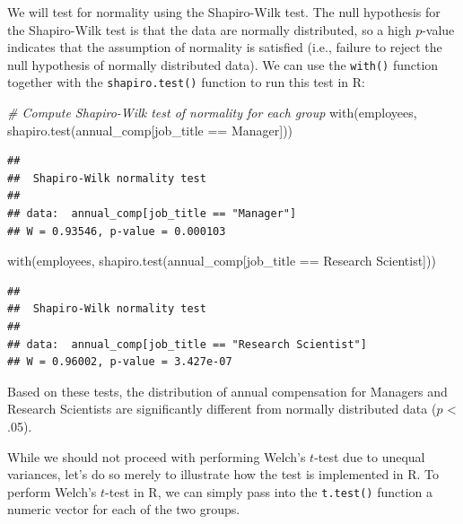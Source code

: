 \documentclass[
]{book}
\newenvironment{Shaded}{\begin{snugshade}}{\end{snugshade}}
\newcommand{\CommentTok}[1]{\textcolor[rgb]{0.56,0.35,0.01}{\textit{#1}}}
\newcommand{\FunctionTok}[1]{\textcolor[rgb]{0.00,0.00,0.00}{#1}}
\newcommand{\NormalTok}[1]{#1}
\newcommand{\SpecialCharTok}[1]{\textcolor[rgb]{0.00,0.00,0.00}{#1}}
\newcommand{\StringTok}[1]{\textcolor[rgb]{0.31,0.60,0.02}{#1}}
\begin{document}
We will test for normality using the Shapiro-Wilk test. The null hypothesis for the Shapiro-Wilk test is that the data are normally distributed, so a high \(p\)-value indicates that the assumption of normality is satisfied (i.e., failure to reject the null hypothesis of normally distributed data). We can use the \texttt{with()} function together with the \texttt{shapiro.test()} function to run this test in R:

\begin{Shaded}
\begin{Highlighting}[]
\CommentTok{\# Compute Shapiro{-}Wilk test of normality for each group}
\FunctionTok{with}\NormalTok{(employees, }\FunctionTok{shapiro.test}\NormalTok{(annual\_comp[job\_title }\SpecialCharTok{==} \StringTok{\textquotesingle{}Manager\textquotesingle{}}\NormalTok{]))}
\end{Highlighting}
\end{Shaded}

\begin{verbatim}
## 
##  Shapiro-Wilk normality test
## 
## data:  annual_comp[job_title == "Manager"]
## W = 0.93546, p-value = 0.000103
\end{verbatim}

\begin{Shaded}
\begin{Highlighting}[]
\FunctionTok{with}\NormalTok{(employees, }\FunctionTok{shapiro.test}\NormalTok{(annual\_comp[job\_title }\SpecialCharTok{==} \StringTok{\textquotesingle{}Research Scientist\textquotesingle{}}\NormalTok{]))}
\end{Highlighting}
\end{Shaded}

\begin{verbatim}
## 
##  Shapiro-Wilk normality test
## 
## data:  annual_comp[job_title == "Research Scientist"]
## W = 0.96002, p-value = 3.427e-07
\end{verbatim}

Based on these tests, the distribution of annual compensation for Managers and Research Scientists are significantly different from normally distributed data (\(p\) \textless{} .05).

While we should not proceed with performing Welch's \(t\)-test due to unequal variances, let's do so merely to illustrate how the test is implemented in R. To perform Welch's \(t\)-test in R, we can simply pass into the \texttt{t.test()} function a numeric vector for each of the two groups.
\end{document}

